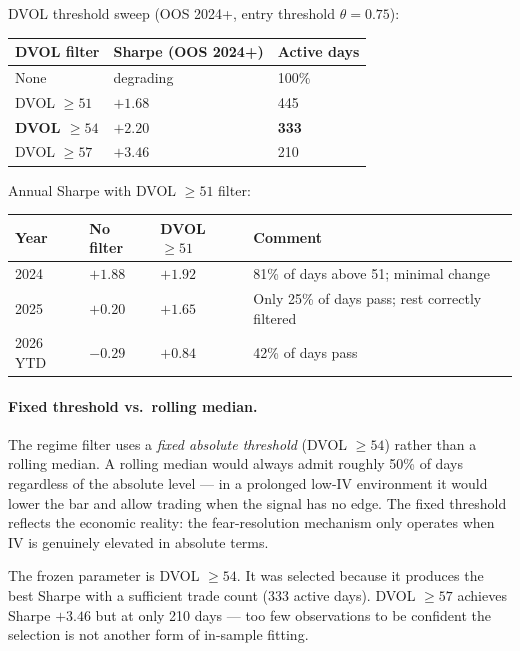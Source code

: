\documentclass[11pt,a4paper]{article}
\begin{document}
DVOL threshold sweep (OOS 2024+, entry threshold $\theta = 0.75$):

\begin{center}
\begin{tabular}{@{}lll@{}}
\toprule
\textbf{DVOL filter} & \textbf{Sharpe (OOS 2024+)} & \textbf{Active days} \\
\midrule
None & degrading & 100\% \\
DVOL $\geq 51$ & $+1.68$ & 445 \\
\textbf{DVOL $\geq 54$} & $\mathbf{+2.20}$ & \textbf{333} \\
DVOL $\geq 57$ & $+3.46$ & 210 \\
\bottomrule
\end{tabular}
\end{center}

Annual Sharpe with DVOL $\geq 51$ filter:

\begin{center}
\begin{tabular}{@{}llll@{}}
\toprule
\textbf{Year} & \textbf{No filter} & \textbf{DVOL $\geq 51$} & \textbf{Comment} \\
\midrule
2024 & $+1.88$ & $+1.92$ & 81\% of days above 51; minimal change \\
2025 & $+0.20$ & $+1.65$ & Only 25\% of days pass; rest correctly filtered \\
2026 YTD & $-0.29$ & $+0.84$ & 42\% of days pass \\
\bottomrule
\end{tabular}
\end{center}

\paragraph{Fixed threshold vs.\ rolling median.}
The regime filter uses a \emph{fixed absolute threshold} (DVOL $\geq 54$) rather than a rolling median. A rolling median would always admit roughly 50\% of days regardless of the absolute level --- in a prolonged low-IV environment it would lower the bar and allow trading when the signal has no edge. The fixed threshold reflects the economic reality: the fear-resolution mechanism only operates when IV is genuinely elevated in absolute terms.

The frozen parameter is DVOL $\geq 54$. It was selected because it produces the best Sharpe with a sufficient trade count (333 active days). DVOL $\geq 57$ achieves Sharpe $+3.46$ but at only 210 days --- too few observations to be confident the selection is not another form of in-sample fitting.
\end{document}
